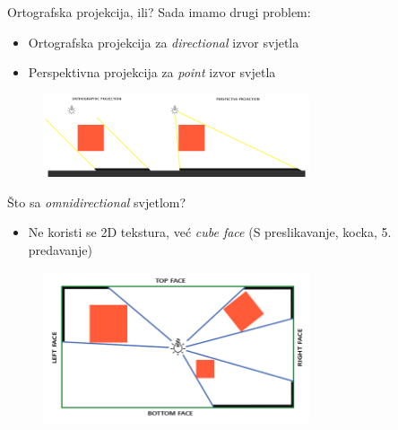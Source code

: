 \documentclass[9pt]{beamer}
\begin{document}
\begin{frame}{Ortografska projekcija, ili?}
	Sada imamo drugi problem:
	\begin{itemize}
		\item Ortografska projekcija za \textit{directional} izvor svjetla
		\item Perspektivna projekcija za \textit{point} izvor svjetla
	\end{itemize}
	\begin{figure}
		\centering
		\includegraphics[width=0.7\textwidth]{slike/shadow_mapping_projection.png}
	\end{figure}
\end{frame}

\begin{frame}{Što sa \textit{omnidirectional} svjetlom?}
	\begin{itemize}
		\item Ne koristi se 2D tekstura, već \textit{cube face} (S preslikavanje, kocka, 5. predavanje)
	\end{itemize}
\begin{figure}
	\centering
	\includegraphics[width=0.7\textwidth]{slike/point_shadows_diagram.png}
\end{figure}
\end{frame}


\end{document}
